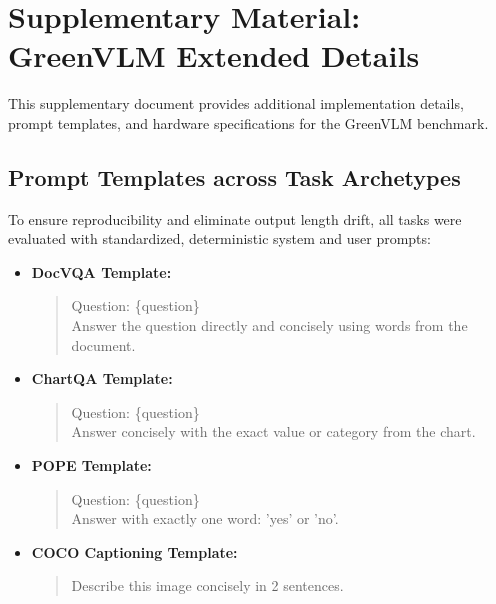 \section{Supplementary Material: GreenVLM Extended Details}
\label{sec:suppl}

This supplementary document provides additional implementation details, prompt templates, and hardware specifications for the GreenVLM benchmark.

\subsection{Prompt Templates across Task Archetypes}
To ensure reproducibility and eliminate output length drift, all tasks were evaluated with standardized, deterministic system and user prompts:

\begin{itemize}[leftmargin=*]
    \item \textbf{DocVQA Template:}
    \begin{quote}
        \ttfamily
        Question: \{question\}\\
        Answer the question directly and concisely using words from the document.
    \end{quote}
    \item \textbf{ChartQA Template:}
    \begin{quote}
        \ttfamily
        Question: \{question\}\\
        Answer concisely with the exact value or category from the chart.
    \end{quote}
    \item \textbf{POPE Template:}
    \begin{quote}
        \ttfamily
        Question: \{question\}\\
        Answer with exactly one word: 'yes' or 'no'.
    \end{quote}
    \item \textbf{COCO Captioning Template:}
    \begin{quote}
        \ttfamily
        Describe this image concisely in 2 sentences.
    \end{quote}
\end{itemize}

